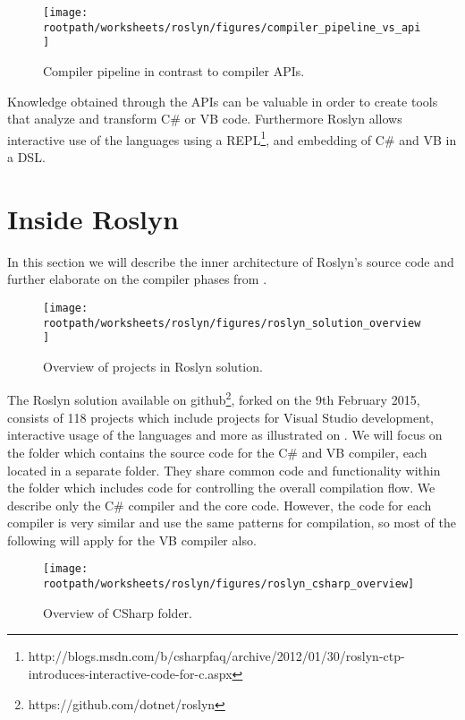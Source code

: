 \begin{figure}[htbp]
\centering
 \texttt{[image: \\rootpath/worksheets/roslyn/figures/compiler\_pipeline\_vs\_api]} 
 \caption{Compiler pipeline in contrast to compiler APIs\cite[p. 4]{ng2012roslyn}.}
\label{fig:api_vs_compiler_pipeline}
\end{figure}

Knowledge obtained through the APIs can be valuable in order to create tools that analyze and transform C\# or \ac{VB} code. Furthermore Roslyn allows interactive use of the languages using a \acs{REPL}\footnote{http://blogs.msdn.com/b/csharpfaq/archive/2012/01/30/roslyn-ctp-introduces-interactive-code-for-c.aspx}, and embedding of  C\# and \ac{VB} in a \ac{DSL}\cite[p. 3]{ng2012roslyn}.

\section{Inside Roslyn}
In this section we will describe the inner architecture of Roslyn's source code and further elaborate on the compiler phases from .

\begin{figure}[htbp]
\centering
 \texttt{[image: \\rootpath/worksheets/roslyn/figures/roslyn\_solution\_overview]} 
 \caption{Overview of projects in Roslyn solution.}
\label{fig:roslyn_solution_overview}
\end{figure}

The Roslyn solution available on github\footnote{https://github.com/dotnet/roslyn}, forked on the 9th February 2015, consists of 118 projects which include projects for Visual Studio development, interactive usage of the languages and more as illustrated on . We will focus on the  folder which contains the source code for the C\# and \ac{VB} compiler, each located in a separate folder. They share common code and functionality within the  folder which includes code for controlling the overall compilation flow. We describe only the C\# compiler and the core code. However, the code for each compiler is very similar and use the same patterns for compilation\cite[09:36-10:36]{campbellDeeperRos}, so most of the following will apply for the \ac{VB} compiler also.

\begin{figure}[htbp]
\centering
 \texttt{[image: \\rootpath/worksheets/roslyn/figures/roslyn\_csharp\_overview]} 
 \caption{Overview of CSharp folder.}
\label{fig:roslyn_csharp_overview}
\end{figure}

